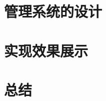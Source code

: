 \documentclass[10pt,english, openany]{book}
\begin{document}
\chapter{管理系统的设计}


\chapter{实现效果展示}


\chapter{总结}


\pagebreak


\renewcommand\bibname{参考文献}



\pagebreak
\end{document}
